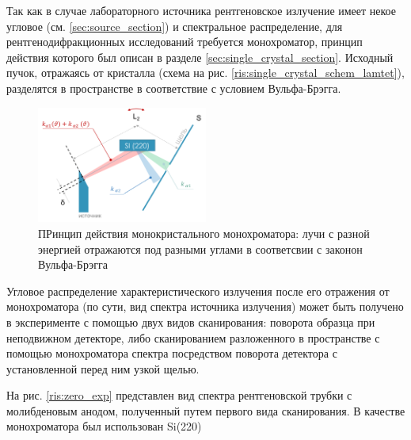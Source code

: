 Так как в случае лабораторного источника рентгеновское излучение имеет
некое угловое  (см. \ref{sec:source_section}) и спектральное распределение,
для рентгенодифракционных исследований требуется монохроматор, принцип действия которого
был описан в разделе \ref{sec:single_crystal_section}. Исходный пучок, отражаясь от
кристалла (схема на рис. \ref{ris:single_crystal_schem_lamtet}), разделятся в пространстве
в соответствие с условием Вульфа-Брэгга.

\begin{figure}[H]
  \centering
  \includegraphics[width=0.5\textwidth]{images/single_crystal_schem_exp.png}
  \caption{ПРинцип действия монокристального монохроматора: лучи с разной энергией отражаются под разными углами
  в соответсвии с законон Вульфа-Брэгга}
  \label{ris:single_crystal_schem_exp}
\end{figure}
%
Угловое распределение характеристического излучения после его отражения от монохроматора (по сути,
вид спектра источника излучения) может быть получено в эксперименте с помощью двух видов сканирования:
поворота образца при неподвижном детекторе, либо сканированием разложенного в пространстве
с помощью монохроматора спектра посредством поворота детектора с установленной перед ним узкой щелью.

На рис. \ref{ris:zero_exp} представлен вид спектра рентгеновской трубки с молибденовым анодом,
полученный путем первого вида сканирования. В качестве монохроматора был использован Si(220)

